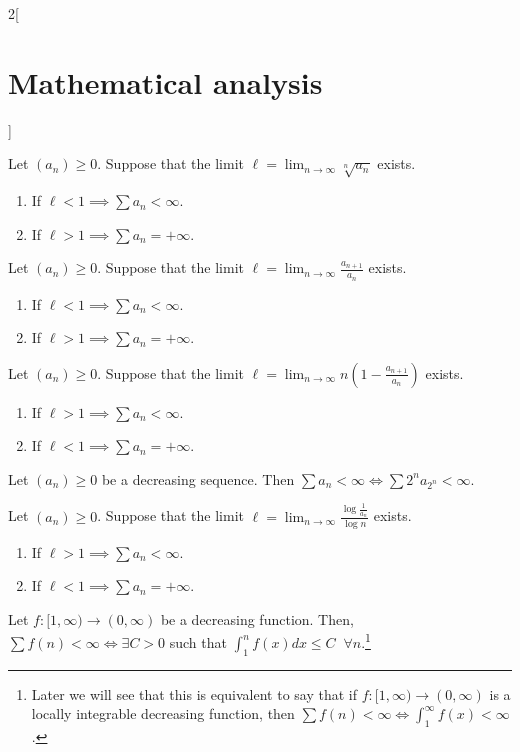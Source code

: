 \documentclass[class=article,crop=false]{standalone}
\begin{document}
\begin{multicols}{2}[\section{Mathematical analysis}]
\begin{theorem}
Let $(a_n)\geq 0$. Suppose that the limit $\displaystyle \ell=\lim_{n\to\infty}\sqrt[n]{a_n}$ exists.
\begin{enumerate}
    \item If $\ell<1\implies\sum a_n<\infty$.
    \item If $\ell>1\implies\sum a_n=+\infty$.
\end{enumerate}
\end{theorem}
\begin{theorem}
Let $(a_n)\geq 0$. Suppose that the limit $\displaystyle \ell=\lim_{n\to\infty}\frac{a_{n+1}}{a_n}$ exists.
\begin{enumerate}
    \item If $\ell<1\implies\sum a_n<\infty$.
    \item If $\ell>1\implies\sum a_n=+\infty$.
\end{enumerate}
\end{theorem}
\begin{theorem}
Let $(a_n)\geq 0$. Suppose that the limit $\displaystyle \ell=\lim_{n\to\infty}n\left(1-\frac{a_{n+1}}{a_n}\right)$ exists.
\begin{enumerate}
    \item If $\ell>1\implies\sum a_n<\infty$.
    \item If $\ell<1\implies\sum a_n=+\infty$.
\end{enumerate}
\end{theorem}
\begin{theorem}
Let $(a_n)\geq 0$ be a decreasing sequence. Then $\sum a_n<\infty\iff\sum 2^na_{2^n}<\infty$.
\end{theorem}
\begin{theorem}
Let $(a_n)\geq 0$. Suppose that the limit $\displaystyle \ell=\lim_{n\to\infty}\frac{\log\frac{1}{a_n}}{\log n}$ exists.
\begin{enumerate}
    \item If $\ell>1\implies\sum a_n<\infty$.
    \item If $\ell<1\implies\sum a_n=+\infty$.
\end{enumerate}
\end{theorem}
\begin{theorem}
Let $f:[1,\infty)\rightarrow(0,\infty)$ be a decreasing function. Then, $\sum f(n)<\infty\iff\exists C>0$ such that $\displaystyle\int_1^nf(x)dx\leq C\;\;\forall n$.\footnote{Later we will see that this is equivalent to say that if $f:[1,\infty)\rightarrow(0,\infty)$ is a locally integrable decreasing function, then $\displaystyle\sum f(n)<\infty\iff\int_1^\infty f(x)<\infty$.}
\end{theorem}

\end{multicols}
\end{document}
